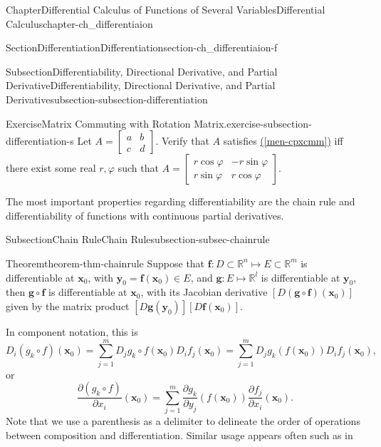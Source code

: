 \documentclass[oneside,10pt,]{book}
\newcommand{\xreffont}{\relax}
\numberwithin{equation}{section}
\newcommand{\bx}{\mathbf{x}}
\newcommand{\by}{\mathbf{y}}
\newcommand{\bbR}{\mathbb{R}}
\newcommand{\amp}{&}
\begin{document}
\begin{chapterptx}{Chapter}{Differential Calculus of Functions of Several Variables}{}{Differential Calculus}{}{}{chapter-ch_differentiaion}
\begin{sectionptx}{Section}{Differentiation}{}{Differentiation}{}{}{section-ch_differentiaion-f}
\begin{subsectionptx}{Subsection}{Differentiability, Directional Derivative, and Partial Derivative}{}{Differentiability, Directional Derivative, and Partial Derivative}{}{}{subsection-subsection-differentiation}
\begin{inlineexercise}{Exercise}{Matrix Commuting with Rotation Matrix.}{exercise-subsection-differentiation-s}%
Let \(\displaystyle{A=\begin{bmatrix} a \amp b \\ c \amp d \end{bmatrix}}\). Verify that \(A\) satisfies \hyperref[men-cpxcmm]{({\xreffont\ref{men-cpxcmm}})} iff there exist some real \(r, \varphi\) such that \(\displaystyle{A=\begin{bmatrix} r\cos\varphi \amp -r \sin\varphi \\ r \sin\varphi \amp r \cos\varphi \end{bmatrix}}\).\end{inlineexercise}%
The most important	properties regarding differentiability are the chain rule and differentiability of functions with continuous partial derivatives.%
\end{subsectionptx}
%
%
\typeout{************************************************}
\typeout{************************************************}
%
\begin{subsectionptx}{Subsection}{Chain Rule}{}{Chain Rule}{}{}{subsection-subsec-chainrule}
\begin{theorem}{Theorem}{}{}{theorem-thm-chainrule}%
%
Suppose that \(\mathbf f:D\subset \bbR^n\mapsto E\subset \bbR^m\) is differentiable at \(\bx_0\), with \(\by_0=\mathbf f(\bx_0) \in E\), and \(\mathbf g:E \mapsto \bbR^l\) is differentiable at \(\by_0\), then \(\mathbf g\circ \mathbf f\) is differentiable at \(\bx_0\), with its Jacobian derivative \([D(\mathbf g\circ \mathbf f) (\bx_0)]\) given by the matrix product \([D\mathbf g (\by_0)][D\mathbf f(\bx_0)]\).%
\par
In component notation, this is%
\begin{equation*}
D_{i}(g_{k}\circ f)(\bx_{0})=\sum_{j=1}^{m}D_{j}g_{k} \circ f (\bx_{0}) D_{i}f_{j}(\bx_{0})=
\sum_{j=1}^{m} D_{j}g_{k} ( f (\bx_{0})) D_{i}f_{j}(\bx_{0}),
\end{equation*}
or%
\begin{equation*}
\frac{\partial (g_{k}\circ f)}{\partial x_{i}}(\bx_{0})=\sum_{j=1}^{m} \frac{\partial g_{k}}{\partial y_{j}}( f (\bx_{0})) 
\frac{\partial f_{j}}{\partial x_{i}}(\bx_{0}).
\end{equation*}
%
Note that we use a parenthesis as a delimiter to delineate the order of operations between composition and differentiation. Similar usage appears often such as in%

\end{theorem}
\end{subsectionptx}
\end{sectionptx}
\end{chapterptx}
\end{document}

